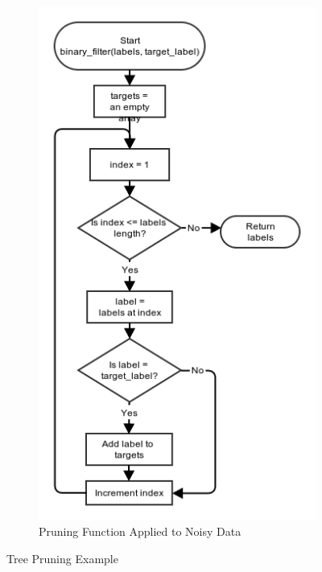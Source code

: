 \documentclass[11pt,a4paper]{article}
\begin{document}
\begin{figure}[!ht]
\begin{subfigure}[b]{0.495\textwidth}
		\includegraphics[width=\textwidth]{images/flow_chart/binary_filter.png}
     	\caption{Pruning Function Applied to Noisy Data}
     	\label{fig:pruningNoisy}
    \end{subfigure}
    \caption{Tree Pruning Example}
    \label{fig:pruning}
\end{figure}
\end{document}
